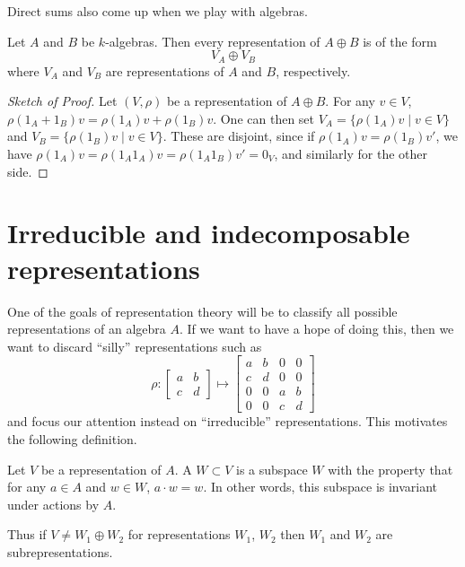 Direct sums also come up when we play with algebras.
\begin{proposition}
	\label{prop:rep_direct_sum}
	Let $A$ and $B$ be $k$-algebras.
	Then every representation of $A \oplus B$ is of the form 
	\[ V_A \oplus V_B \]
	where $V_A$ and $V_B$ are representations of $A$ and $B$, respectively.
\end{proposition}
\begin{proof}[Sketch of Proof]
	Let $(V, \rho)$ be a representation of $A \oplus B$.
	For any $v \in V$, $\rho(1_A+1_B)v = \rho(1_A)v + \rho(1_B)v$.
	One can then set $V_A = \{ \rho(1_A)v \mid v \in V \}$
	and $V_B = \{ \rho(1_B)v \mid v \in V \}$.
	These are disjoint, since if $\rho(1_A) v = \rho(1_B) v'$,
	we have $\rho(1_A)v = \rho(1_A1_A)v = \rho(1_A1_B) v' = 0_V$,
	and similarly for the other side.
\end{proof}

\section{Irreducible and indecomposable representations}

One of the goals of representation theory will be to classify
all possible representations of an algebra $A$.
If we want to have a hope of doing this,
then we want to discard ``silly'' representations such as
\[
	\rho : 
	\begin{bmatrix} a & b \\ c & d \end{bmatrix} 
	\mapsto
	\begin{bmatrix} a & b & 0 & 0 \\ c & d & 0 & 0 \\
		0 & 0 & a & b \\ 0 & 0 & c & d \end{bmatrix}
\]
and focus our attention instead on ``irreducible'' representations.
This motivates the following definition.

\begin{definition}
	Let $V$ be a representation of $A$.
	A  $W \subset V$ is a subspace $W$
	with the property that for any $a \in A$ and $w \in W$,
	$a \cdot w = w$.
	In other words, this subspace is invariant under actions by $A$.
\end{definition}
Thus if $V \neq W_1 \oplus W_2$ for representations $W_1$, $W_2$
then $W_1$ and $W_2$ are subrepresentations.

